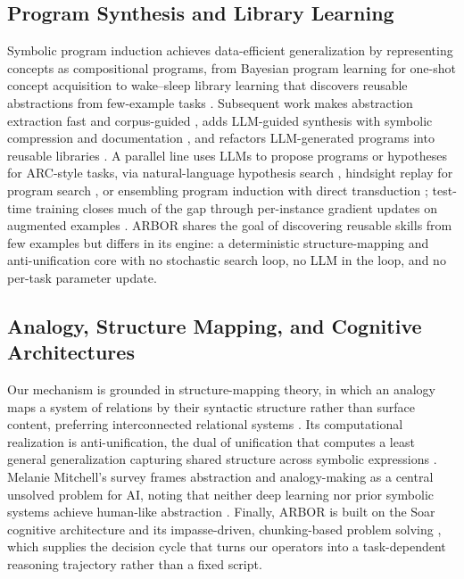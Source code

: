 \documentclass[letterpaper]{article} %
\begin{document}
\subsection{Program Synthesis and Library Learning}
Symbolic program induction achieves data-efficient generalization by
representing concepts as compositional programs, from Bayesian program learning
for one-shot concept acquisition \cite{lake2015human} to wake--sleep library
learning that discovers reusable abstractions from few-example tasks
\cite{ellis2021dreamcoder}. Subsequent work makes abstraction extraction fast
and corpus-guided \cite{bowers2023stitch}, adds LLM-guided synthesis with
symbolic compression and documentation \cite{grand2024lilo}, and refactors
LLM-generated programs into reusable libraries \cite{stengeleskin2024regal}.
A parallel line uses LLMs to propose programs or hypotheses for ARC-style tasks,
via natural-language hypothesis search \cite{wang2024hypothesis}, hindsight
replay for program search \cite{butt2024codeit}, or ensembling program induction
with direct transduction \cite{li2025induction}; test-time training closes much
of the gap through per-instance gradient updates on augmented examples
\cite{akyurek2024ttt}. ARBOR shares the goal of discovering reusable skills from
few examples but differs in its engine: a deterministic structure-mapping and
anti-unification core with no stochastic search loop, no LLM in the loop, and no
per-task parameter update.

\subsection{Analogy, Structure Mapping, and Cognitive Architectures}
Our mechanism is grounded in structure-mapping theory, in which an analogy maps
a system of relations by their syntactic structure rather than surface content,
preferring interconnected relational systems \cite{gentner1983structure}. Its
computational realization is anti-unification, the dual of unification that
computes a least general generalization capturing shared structure across
symbolic expressions \cite{cerna2023antiunification}. Melanie Mitchell's survey
frames abstraction and analogy-making as a central unsolved problem for AI,
noting that neither deep learning nor prior symbolic systems achieve human-like
abstraction \cite{mitchell2021abstraction}. Finally, ARBOR is built on the Soar
cognitive architecture and its impasse-driven, chunking-based problem solving
\cite{newell1990unified,laird2012soar}, which supplies the decision cycle that
turns our operators into a task-dependent reasoning trajectory rather than a
fixed script.
\end{document}
